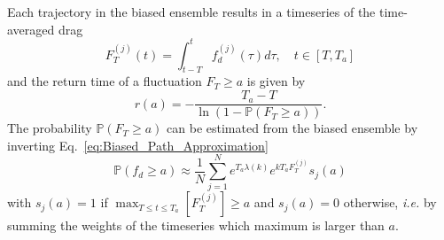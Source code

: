 \documentclass{jfm}
\begin{document}
Each trajectory in the biased ensemble results in a timeseries of the time-averaged drag
\begin{equation}
\label{eq:time_averaged}
F_T^{(j)}(t) = \int_{t-T}^{t}f_d^{(j)}(\tau)d\tau, \quad t\in [T,T_a]  
\end{equation}
and the return time of a fluctuation $F_T \geq a$ is given by~\citep{lestang_computing_2018}
\begin{equation}
r(a) = - \frac{T_a - T}{\ln (1-\mathbb{P}(F_T \geq a))}.
\end{equation}
%
The probability $\mathbb{P}(F_T \geq a)$ can be estimated from the biased ensemble by inverting Eq.~\eqref{eq:Biased_Path_Approximation}
\begin{equation}
\mathbb{P}(f_d \geq a) \approx \frac{1}{N}\sum_{j=1}^{N}e^{T_a \lambda(k)}e^{k T_a  F_T^{(j)}}s_j(a)
\end{equation}
with $s_j(a) = 1$ if $\max_{T\leq t \leq T_a}[F_T^{(j)}] \geq a$ and $s_j(a) = 0$ otherwise, \emph{i.e.} by summing the weights of the timeseries which maximum is larger than $a$.











\newpage
\end{document}
